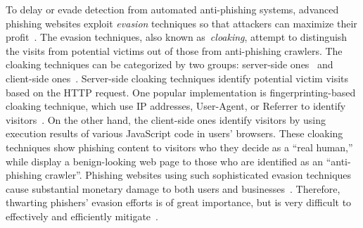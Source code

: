 To delay or evade detection from automated anti-phishing systems, advanced phishing websites exploit \emph{evasion} techniques so that attackers can maximize their profit~\cite{thomas2017data}.
The evasion techniques, also known as~\emph{cloaking}, 
attempt to distinguish the visits from potential victims out of those from anti-phishing crawlers.
The cloaking techniques can be categorized by two groups: server-side ones~\cite{oest2018inside} and client-side ones~\cite{zhang2021crawlphish}.
Server-side cloaking techniques identify potential victim visits based on the HTTP request.
One popular implementation is fingerprinting-based cloaking technique, which use IP addresses, User-Agent, or Referrer to identify visitors~\cite{oest2018inside}.
On the other hand, the client-side ones identify visitors by using execution results of various JavaScript code in users' browsers.
These cloaking techniques show phishing content to visitors who they decide as a ``real human,'' while display a benign-looking web page to those who are identified as an ``anti-phishing crawler''.
Phishing websites using such sophisticated evasion techniques cause substantial monetary damage to both users and businesses~\cite{oest2020sunrise}.
Therefore, thwarting phishers' evasion efforts is of great importance, but is very difficult to effectively and efficiently mitigate~\cite{oest2020sunrise, zhang2021crawlphish}.

